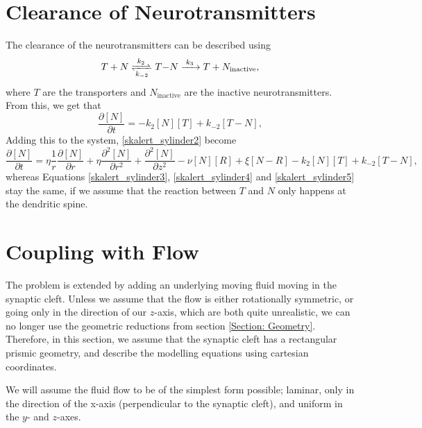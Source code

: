 \documentclass{article}
\begin{document}
\section{Clearance of Neurotransmitters}
The clearance of the neurotransmitters can be described using
\begin{equation*}
\ce{$T$ + $N$ <=>[$k_2$][$k_{-2}$] $T-N$ ->[$k_3$] $T$ + $N_{\text{inactive}}$},
\end{equation*}
where $T$ are the transporters and $N_{\text{inactive}}$ are the inactive neurotransmitters. From this, we get that
\begin{equation*}
    \frac{\partial [N]}{\partial t} = - k_2 [N][T] + k_{-2} [T-N],
\end{equation*}
Adding this to the system, \eqref{skalert_sylinder2} become
\begin{equation}
    \frac{\partial [N]}{\partial t} = 
    \eta \frac{1}{r} \frac{\partial [N]}{\partial r} +\eta  \frac{\partial^2 [N]}{\partial r^2}  +  \frac{\partial^2 [N]}{\partial z^2} -  \nu [N] [R] +  \xi [N-R] - k_2 [N][T] + k_{-2} [T-N],
\end{equation}
whereas Equations \eqref{skalert_sylinder3}, \eqref{skalert_sylinder4} and \eqref{skalert_sylinder5} stay the same, if we assume that the reaction between $T$ and $N$ only happens at the dendritic spine.

\section{Coupling with Flow}
The problem is extended by adding an underlying moving fluid moving in the synaptic cleft. Unless we assume that the flow is either rotationally symmetric, or going only in the direction of our $z$-axis, which are both quite unrealistic, we can no longer use the geometric reductions from section \ref{Section: Geometry}. Therefore, in this section, we assume that the synaptic cleft has a rectangular prismic geometry, and describe the modelling equations using cartesian coordinates.

We will assume the fluid flow to be of the simplest form possible; laminar, only in the direction of the x-axis (perpendicular to the synaptic cleft), and uniform in the $y$- and $z$-axes.
\end{document}
